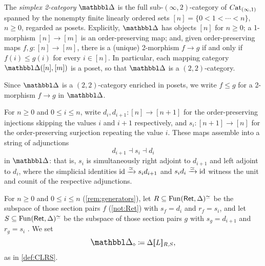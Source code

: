 \documentclass[a4paper,reqno,twoside]{amsart}
\begin{document}
\begin{definition}\label{def:ddelta}
	The \emph{simplex 2-category} $\ddelta$ is the full sub-$(\infty,2)$-category of $\relax{C}\mathrm{at}_{(\infty,1)}$ spanned by the nonempty finite linearly ordered sets $[n] = \{0 < 1 < \cdots < n\}$, $n \geq 0$, regarded as posets. Explicitly, $\ddelta$ has objects $[n]$ for $n \geq 0$; a 1-morphism $[n] \to [m]$ is an order-preserving map; and, given order-preserving maps $f,g \colon [n] \to [m]$, there is a (unique) 2-morphism $f \rightarrow g$ if and only if $f(i) \leq g(i)$ for every $i \in [n]$. In particular, each mapping category $\ddelta([n],[m])$ is a poset, so that $\ddelta$ is a $(2,2)$-category.
\end{definition}

\begin{notation}\label{not:inequality}
	Since $\ddelta$ is a $(2,2)$-category enriched in posets, we write $f \leq g$ for a 2-morphism $f \to g$ in $\ddelta$.
\end{notation}

\begin{remark}\label{rem:generators}
	For $n \geq 0$ and $0 \leq i \leq n$, write $d_i,d_{i+1} \colon [n] \to [n+1]$ for the order-preserving injections skipping the values $i$ and $i+1$ respectively, and $s_i \colon [n+1] \to [n]$ for the order-preserving surjection repeating the value $i$. These maps assemble into a string of adjunctions
	\[
		d_{i+1} \dashv s_i \dashv d_i
	\]
	in $\ddelta$: that is, $s_i$ is simultaneously right adjoint to $d_{i+1}$ and left adjoint to $d_i$, where the simplicial identities $\mathrm{id} \xrightarrow{\simeq} s_i d_{i+1}$ and $s_i d_i \xrightarrow{\simeq} \mathrm{id}$ witness the unit and counit of the respective adjunctions.
\end{remark}





\begin{definition}\label{def:representingdelta}
	For $n \geq 0$ and $0 \leq i \leq n$ (\cref{rem:generators}), let $R \subseteq \mathrm{Fun}(\mathsf{Ret},\Delta)^{\simeq}$ be the subspace of those section pairs $f$ (\cref{not:Ret}) with $s_f = d_i$ and $r_f = s_i$, and let $S \subseteq \mathrm{Fun}(\mathsf{Ret},\Delta)^{\simeq}$ be the subspace of those section pairs $g$  with $s_g = d_{i+1}$ and $r_g = s_i$ . We set
	\[
		\ddelta_{\diamond} \coloneqq \Delta\soft{\cL}_{R,S},
	\]
	as in \cref{def:CLRS}.
\end{definition}
\end{document}
